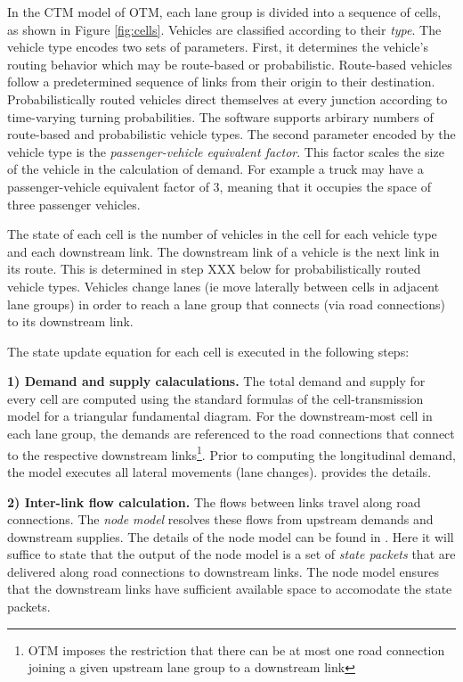 In the CTM model of OTM, each lane group is divided into a sequence of cells, as shown in Figure \ref{fig:cells}. Vehicles are classified according to their \textit{type}. The vehicle type encodes two sets of parameters. First, it determines the vehicle's routing behavior which may be route-based or probabilistic. Route-based vehicles follow a predetermined sequence of links from their origin to their destination. Probabilistically routed vehicles direct themselves at every junction according to time-varying turning probabilities. The software supports arbirary numbers of route-based and probabilistic vehicle types. The second parameter encoded by the vehicle type is the \textit{passenger-vehicle equivalent factor}. This factor scales the size of the vehicle in the calculation of demand. For example a truck may have a passenger-vehicle equivalent factor of 3, meaning that it occupies the space of three passenger vehicles.

The state of each cell is the number of vehicles in the cell for each vehicle type and each downstream link. The downstream link of a vehicle is the next link in its route. This is determined in step XXX below for probabilistically routed vehicle types. Vehicles change lanes (ie move laterally between cells in adjacent lane groups) in order to reach a lane group that connects (via road connections) to its downstream link. 

The state update equation for each cell is executed in the following steps:

\vspace{1em} \noindent \textbf{1) Demand and supply calaculations.} The total demand and supply for every cell are computed using the standard formulas of the cell-transmission model for a triangular fundamental diagram. For the downstream-most cell in each lane group, the demands are referenced to the road connections that connect to the respective downstream links\footnote{OTM imposes the restriction that there can be at most one road connection joining a given upstream lane group to a downstream link}. Prior to computing the longitudinal demand, the model executes all lateral movements (lane changes). \cite{Gomes2019OpenTM} provides the details. 

\vspace{1em}\noindent \textbf{2) Inter-link flow calculation.} The flows between links travel along road connections. The \textit{node model} resolves these flows from upstream demands and downstream supplies. The details of the node model can be found in \cite{Gomes2019OpenTM}. Here it will suffice to state that the output of the node model is a set of \textit{state packets} that are delivered along road connections to downstream links. The node model ensures that the downstream links have sufficient available space to accomodate the state packets.  

